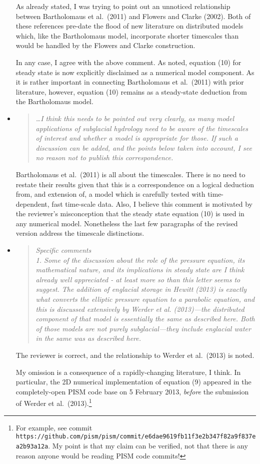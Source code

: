 \documentclass[11pt,reqno]{amsart}
\newcommand{\reply}[2]{
\medskip\medskip
\item  \begin{quote}
\emph{#1}
\end{quote}

\medskip
\noindent #2}
\begin{document}
\begin{itemize}
{As already stated, I was trying to point out an unnoticed relationship between Bartholomaus et al.~(2011) and Flowers and Clarke (2002).  Both of these references pre-date the flood of new literature on distributed models which, like the Bartholomaus model, incorporate shorter timescales than would be handled by the Flowers and Clarke construction.

In any case, I agree with the above comment.  As noted, equation (10) for steady state is now explicitly disclaimed as a numerical model component.  As it is rather important in connecting Bartholomaus et al.~(2011) with prior literature, however, equation (10) remains as a steady-state deduction from the Bartholomaus model.}

\reply{\dots I think this needs to be pointed out very clearly, as many model applications of subglacial hydrology need to be aware of the timescales of interest and whether a model is appropriate for those. If such a discussion can be added, and the points below taken into account, I see no reason not to publish this correspondence.}
{Bartholomaus et al.~(2011) is all about the timescales.  There is no need to restate their results given that this is a correspondence on a logical deduction from, and extension of, a model which is carefully tested with time-dependent, fast time-scale data.  Also, I believe this comment is motivated by the reviewer's misconception that the steady state equation (10) is used in any numerical model.  Nonetheless the last few paragraphs of the revised version address the timescale distinctions.}

\reply{Specific comments \smallskip \\
1. Some of the discussion about the role of the pressure equation, its mathematical nature, and its implications in steady state are I think already well appreciated - at least more so than this letter seems to suggest. The addition of englacial storage in Hewitt (2013) is exactly what converts the elliptic pressure equation to a parabolic equation, and this is discussed extensively by Werder et al. (2013)---the distributed component of that model is essentially the same as described here.  Both of those models are not purely subglacial---they include englacial water in the same was as described here.}
{The reviewer is correct, and the relationship to Werder et al.~(2013) is noted.

My omission is a consequence of a rapidly-changing literature, I think.  In particular, the 2D numerical implementation of equation (9) appeared in the completely-open PISM code base on 5 February 2013, \emph{before} the submission of Werder et al.~(2013).\footnote{For example, see commit \texttt{https://github.com/pism/pism/commit/e6dae9619fb11f3e2b347f82a9f837ea2b93a12a}.  My point is that my claim can be verified, not that there is any reason anyone would be reading PISM code commits!}

}
\end{itemize}
\end{document}
